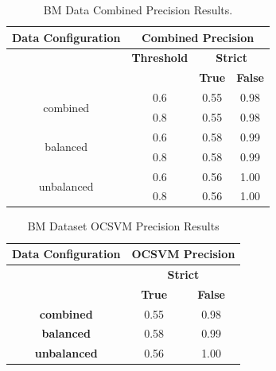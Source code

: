 \documentclass{mpaper}
\begin{document}
\begin{table}[]
\centering
\begin{tabular}{|c|ccc|}
\hline
\textbf{Data Configuration} & \multicolumn{3}{c|}{\textbf{Combined Precision}}                                              \\ \hline
                              & \multicolumn{1}{c|}{\textbf{Threshold}} & \multicolumn{2}{c|}{\textbf{Strict}}                \\ \cline{2-4} 
                              & \multicolumn{1}{c|}{\textbf{}}          & \textbf{True} & \multicolumn{1}{l|}{\textbf{False}} \\ \hline
\multirow{2}{*}{combined}     & \multicolumn{1}{c|}{0.6}                & 0.55          & 0.98                                \\
                              & \multicolumn{1}{c|}{0.8}                & 0.55          & 0.98                                \\ \hline
\multirow{2}{*}{balanced}     & \multicolumn{1}{c|}{0.6}                & 0.58          & 0.99                                \\
                              & \multicolumn{1}{c|}{0.8}                & 0.58          & 0.99                                \\ \hline
\multirow{2}{*}{unbalanced}   & \multicolumn{1}{c|}{0.6}                & 0.56          & 1.00                                \\
                              & \multicolumn{1}{c|}{0.8}                & 0.56          & 1.00                                \\ \hline
\end{tabular}
\caption{\label{tab:bm_combined_precision}BM Data Combined Precision Results.}
\end{table}

\begin{table}[]
\centering
\begin{tabular}{|c|cc|}
\hline
\textbf{Data Configuration} & \multicolumn{2}{c|}{\textbf{OCSVM Precision}} \\ \hline
\textbf{}                     & \multicolumn{2}{c|}{\textbf{Strict}}          \\ \cline{2-3} 
\textbf{}                     & \textbf{True}         & \textbf{False}        \\ \hline
\textbf{combined}             & 0.55                  & 0.98                  \\
\textbf{balanced}             & 0.58                  & 0.99                  \\
\textbf{unbalanced}           & 0.56                  & 1.00                  \\ \hline
\end{tabular}
\caption{\label{tab:bm_ocsvm_precision}BM Dataset OCSVM Precision Results}
\end{table}
\end{document}
